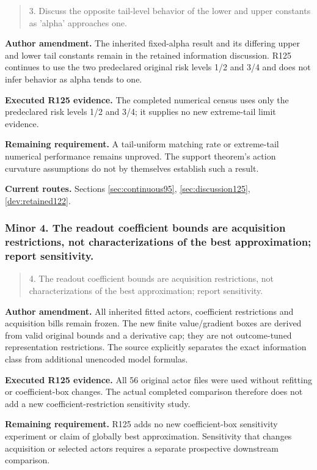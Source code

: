 \begin{quote}\small
3. Discuss the opposite tail-level behavior of the lower and upper constants as 'alpha' approaches one.
\end{quote}

\noindent\textbf{Author amendment.} The inherited fixed-alpha result and its differing upper and lower tail constants remain in the retained information discussion. R125 continues to use the two predeclared original risk levels 1/2 and 3/4 and does not infer behavior as alpha tends to one.

\noindent\textbf{Executed R125 evidence.} The completed numerical census uses only the predeclared risk levels 1/2 and 3/4; it supplies no new extreme-tail limit evidence.

\noindent\textbf{Remaining requirement.} A tail-uniform matching rate or extreme-tail numerical performance remains unproved. The support theorem's action curvature assumptions do not by themselves establish such a result.

\noindent\textbf{Current routes.} Sections \ref{sec:continuous95}, \ref{sec:discussion125}, \ref{dev:retained122}.

\subsubsection{Minor 4. The readout coefficient bounds are acquisition restrictions, not characterizations of the best approximation; report sensitivity.}

\begin{quote}\small
4. The readout coefficient bounds are acquisition restrictions, not characterizations of the best approximation; report sensitivity.
\end{quote}

\noindent\textbf{Author amendment.} All inherited fitted actors, coefficient restrictions and acquisition bills remain frozen. The new finite value/gradient boxes are derived from valid original bounds and a derivative cap; they are not outcome-tuned representation restrictions. The source explicitly separates the exact information class from additional unencoded model formulas.

\noindent\textbf{Executed R125 evidence.} All 56 original actor files were used without refitting or coefficient-box changes. The actual completed comparison therefore does not add a new coefficient-restriction sensitivity study.

\noindent\textbf{Remaining requirement.} R125 adds no new coefficient-box sensitivity experiment or claim of globally best approximation. Sensitivity that changes acquisition or selected actors requires a separate prospective downstream comparison.

